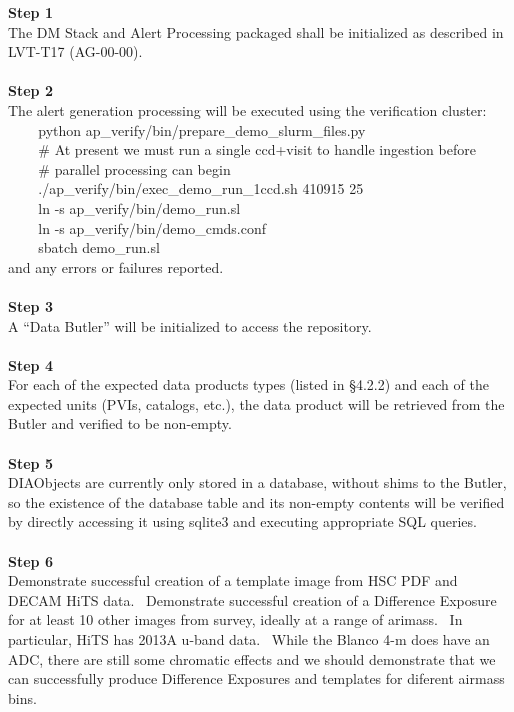 \textbf{Step 1}\\
The DM Stack and Alert Processing packaged shall be initialized as
described in LVT-T17 (AG-00-00).\\
~\\
\textbf{Step 2}\\
The alert generation processing will be executed using the verification
cluster:\\
\hspace*{0.333em} ~ ~ ~python
ap\_verify/bin/prepare\_demo\_slurm\_files.py\\
\hspace*{0.333em} ~ ~ ~\# At present we must run a single ccd+visit to
handle ingestion before\\
\hspace*{0.333em} ~ ~ ~\# parallel processing can begin\\
\hspace*{0.333em} ~ ~ ~./ap\_verify/bin/exec\_demo\_run\_1ccd.sh 410915
25\\
\hspace*{0.333em} ~ ~ ~ln -s ap\_verify/bin/demo\_run.sl\\
\hspace*{0.333em} ~ ~ ~ln -s ap\_verify/bin/demo\_cmds.conf\\
\hspace*{0.333em} ~ ~ ~sbatch demo\_run.sl\\
and any errors or failures reported.\\
~\\
\textbf{Step 3}\\
A ``Data Butler'' will be initialized to access the repository.\\
~\\
\textbf{Step 4}\\
For each of the expected data products types (listed in §4.2.2) and each
of the expected units (PVIs, catalogs, etc.), the data product will be
retrieved from the Butler and verified to be non-empty.\\
~\\
\textbf{Step 5}\\
DIAObjects are currently only stored in a database, without shims to the
Butler, so the existence of the database table and its non-empty
contents will be verified by directly accessing it using sqlite3 and
executing appropriate SQL queries.\\
~\\
\textbf{Step 6}\\
Demonstrate successful creation of a template image from HSC PDF and
DECAM HiTS data. ~Demonstrate successful creation of a Difference
Exposure for at least 10 other images from survey, ideally at a range of
arimass. ~In particular, HiTS has 2013A u-band data. ~While the Blanco
4-m does have an ADC, there are still some chromatic effects and we
should demonstrate that we can successfully produce Difference Exposures
and templates for diferent airmass bins.\\
~\\

